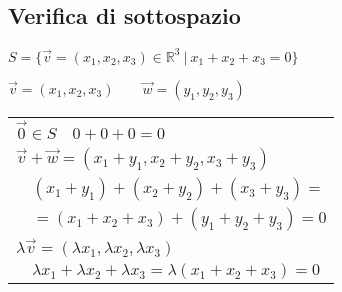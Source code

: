 \subsection{Verifica di sottospazio}
$S = \{ \vec{v} = (x_1, x_2, x_3) \in \mathbb{R}^3\ |\ x_1 + x_2 + x_3 = 0 \}$

$\vec{v} = (x_1, x_2, x_3) \qquad \vec{w} = (y_1, y_2, y_3)$

\begin{tabular}{l}
	$\vec{0} \in S \quad 0 + 0 + 0 = 0$ \\
	$\vec{v}+\vec{w} = (x_1+y_1, x_2+y_2, x_3+y_3)$ \\
	$\quad (x_1+y_1) + (x_2+y_2) + (x_3+y_3) = $ \\
	$\quad = (x_1 + x_2 + x_3) + (y_1+y_2+y_3) = 0$ \\
	$\lambda\vec{v} = (\lambda x_1, \lambda x_2, \lambda x_3)$ \\
	$\quad \lambda x_1 + \lambda x_2 + \lambda x_3 = \lambda(x_1+x_2+x_3) = 0$
\end{tabular}